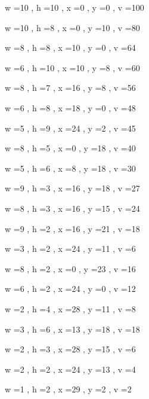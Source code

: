 \documentclass[11pt]{article}
\begin{document}
w =10 , h =10 , x =0 , y =0 , v =100
\par
w =10 , h =8 , x =0 , y =10 , v =80
\par
w =8 , h =8 , x =10 , y =0 , v =64
\par
w =6 , h =10 , x =10 , y =8 , v =60
\par
w =8 , h =7 , x =16 , y =8 , v =56
\par
w =6 , h =8 , x =18 , y =0 , v =48
\par
w =5 , h =9 , x =24 , y =2 , v =45
\par
w =8 , h =5 , x =0 , y =18 , v =40
\par
w =5 , h =6 , x =8 , y =18 , v =30
\par
w =9 , h =3 , x =16 , y =18 , v =27
\par
w =8 , h =3 , x =16 , y =15 , v =24
\par
w =9 , h =2 , x =16 , y =21 , v =18
\par
w =3 , h =2 , x =24 , y =11 , v =6
\par
w =8 , h =2 , x =0 , y =23 , v =16
\par
w =6 , h =2 , x =24 , y =0 , v =12
\par
w =2 , h =4 , x =28 , y =11 , v =8
\par
w =3 , h =6 , x =13 , y =18 , v =18
\par
w =2 , h =3 , x =28 , y =15 , v =6
\par
w =2 , h =2 , x =24 , y =13 , v =4
\par
w =1 , h =2 , x =29 , y =2 , v =2
\par
\newpage
\end{document}
